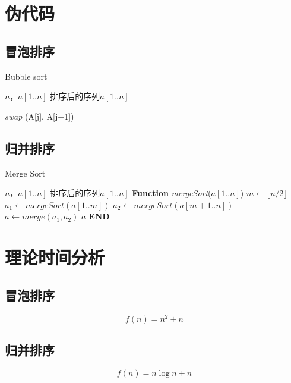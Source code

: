 \documentclass[UTF8]{ctexart}
\begin{document}
\section{伪代码}
\subsection{冒泡排序}
\begin{algorithm}
    \caption{Bubble sort}
    \label{alg3}
    \begin{algorithmic}[1]
        \REQUIRE $n$，$a[1..n]$
        \ENSURE 排序后的序列$a[1..n]$

        \STATE \textit{swap} (A[j], A[j+1])
        \ENDIF
        \ENDFOR
        \ENDFOR
    \end{algorithmic}
\end{algorithm}

\subsection{归并排序}
\begin{algorithm}
    \caption{Merge Sort}
    \begin{algorithmic}[1]
        \REQUIRE $n$，$a[1..n]$
        \ENSURE 排序后的序列$a[1..n]$
        \STATE \textbf{Function} \textit{mergeSort}($a[1..n]$)
        \STATE $m \gets \lfloor n/2 \rfloor$
        \STATE $a_1 \gets mergeSort(a[1..m])$
        \STATE $a_2 \gets mergeSort(a[m+1..n])$
        \STATE $a \gets merge(a_1, a_2)$
        \ENDIF
        \RETURN $a$
        \STATE \textbf{END}
    \end{algorithmic}
\end{algorithm}

\newpage
\section{理论时间分析}
\subsection{冒泡排序}
\[f(n) = n ^ 2 + n\]
\subsection{归并排序}
\[f(n) = n \log n + n\]

\vskip 1cm

\newpage
\end{document}
